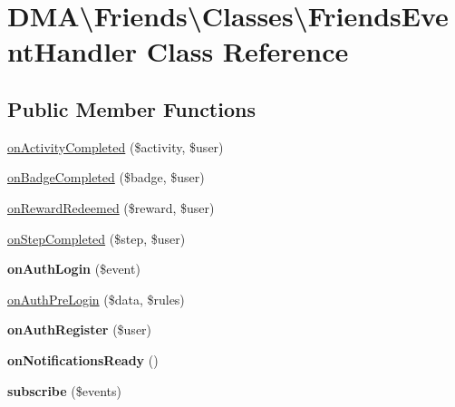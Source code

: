 \hypertarget{classDMA_1_1Friends_1_1Classes_1_1FriendsEventHandler}{}\section{D\+M\+A\textbackslash{}Friends\textbackslash{}Classes\textbackslash{}Friends\+Event\+Handler Class Reference}
\label{classDMA_1_1Friends_1_1Classes_1_1FriendsEventHandler}
\subsection*{Public Member Functions}
\begin{DoxyCompactItemize}
\item 
\hyperlink{classDMA_1_1Friends_1_1Classes_1_1FriendsEventHandler_a6467365017b9d494122c8ded41a9a406}{on\+Activity\+Completed} (\$activity, \$user)
\item 
\hyperlink{classDMA_1_1Friends_1_1Classes_1_1FriendsEventHandler_aa13c2568369d06c2a0ca1c96f099ff09}{on\+Badge\+Completed} (\$badge, \$user)
\item 
\hyperlink{classDMA_1_1Friends_1_1Classes_1_1FriendsEventHandler_aeb8499a09334c87311a7f5840c43685a}{on\+Reward\+Redeemed} (\$reward, \$user)
\item 
\hyperlink{classDMA_1_1Friends_1_1Classes_1_1FriendsEventHandler_a3a99cae5eaa37efa395ef4fe8eb30c11}{on\+Step\+Completed} (\$step, \$user)
\item 
\hypertarget{classDMA_1_1Friends_1_1Classes_1_1FriendsEventHandler_a480d5807466962402ccc13260cfb0930}{}{\bfseries on\+Auth\+Login} (\$event)\label{classDMA_1_1Friends_1_1Classes_1_1FriendsEventHandler_a480d5807466962402ccc13260cfb0930}

\item 
\hyperlink{classDMA_1_1Friends_1_1Classes_1_1FriendsEventHandler_af494bf71f7c0eed4f82f4521c15a0ea2}{on\+Auth\+Pre\+Login} (\$data, \$rules)
\item 
\hypertarget{classDMA_1_1Friends_1_1Classes_1_1FriendsEventHandler_aa1d57544bd13c8acf91a3f4e3bf150a5}{}{\bfseries on\+Auth\+Register} (\$user)\label{classDMA_1_1Friends_1_1Classes_1_1FriendsEventHandler_aa1d57544bd13c8acf91a3f4e3bf150a5}

\item 
\hypertarget{classDMA_1_1Friends_1_1Classes_1_1FriendsEventHandler_ac411d3e487b4a16bd3116f3abf1e38a7}{}{\bfseries on\+Notifications\+Ready} ()\label{classDMA_1_1Friends_1_1Classes_1_1FriendsEventHandler_ac411d3e487b4a16bd3116f3abf1e38a7}

\item 
\hypertarget{classDMA_1_1Friends_1_1Classes_1_1FriendsEventHandler_a92cad97622be6dd1ed477dcc05d81074}{}{\bfseries subscribe} (\$events)\label{classDMA_1_1Friends_1_1Classes_1_1FriendsEventHandler_a92cad97622be6dd1ed477dcc05d81074}

\end{DoxyCompactItemize}


